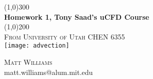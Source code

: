 \documentclass{article}
\begin{document}
\begin{titlepage}
	\begin{center}
	\line(1,0){300} \\ %
	[0.25in]               %
	\huge{\bfseries Homework 1, Tony Saad's uCFD Course} \\
	[2mm]
	\line(1,0){200} \\
	[1.5cm]
	\textsc{\LARGE From University of Utah CHEN 6355} \\
	[1cm]
	\texttt{[image: advection]} \\
	[4cm]
	\end{center}
	\begin{flushright}
	\textsc{\large Matt Williams} \\
	matt.williams@alum.mit.edu
	\end{flushright}
\end{titlepage}
\end{document}
